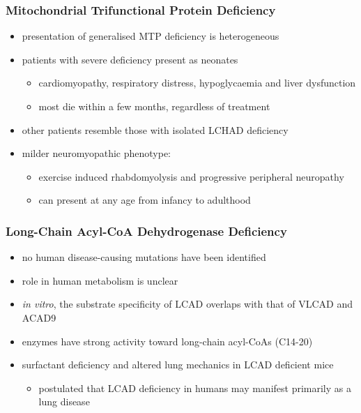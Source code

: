 \documentclass{scrartcl}
\begin{document}
\subsubsection{Mitochondrial Trifunctional Protein Deficiency}
\label{sec:org394e0c1}
\begin{itemize}
\item presentation of generalised MTP deficiency is heterogeneous
\item patients with severe deficiency present as neonates
\begin{itemize}
\item cardiomyopathy, respiratory distress, hypoglycaemia and liver dysfunction
\item most die within a few months, regardless of treatment
\end{itemize}
\item other patients resemble those with isolated LCHAD deficiency
\item milder neuromyopathic phenotype:
\begin{itemize}
\item exercise induced rhabdomyolysis and progressive peripheral
neuropathy
\item can present at any age from infancy to adulthood
\end{itemize}
\end{itemize}

\subsubsection{Long-Chain Acyl-CoA Dehydrogenase Deficiency}
\label{sec:org2fda04c}
\begin{itemize}
\item no human disease-causing mutations have been identified
\item role  in  human  metabolism  is unclear
\item \emph{in vitro}, the substrate specificity of LCAD overlaps with that of
VLCAD and ACAD9
\item enzymes have strong activity toward long-chain acyl-CoAs (C14-20)
\item surfactant deficiency and altered lung mechanics in LCAD deficient
mice
\begin{itemize}
\item postulated that LCAD deficiency in humans may manifest primarily
as a lung disease
\end{itemize}
\end{itemize}
\end{document}
